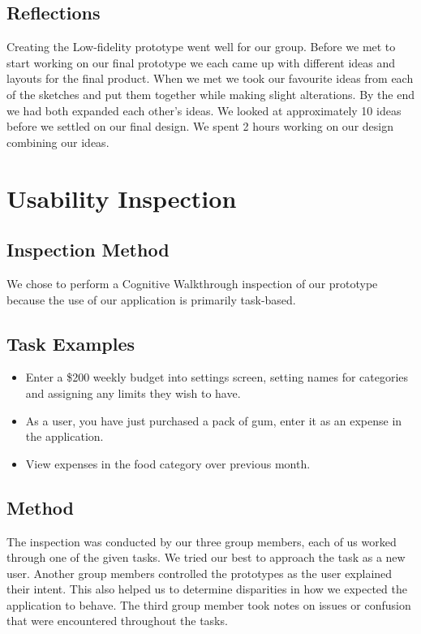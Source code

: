 \documentclass{chi2011}
\begin{document}
    \subsection{Reflections}

    Creating the Low-fidelity prototype went well for our group. Before we met
    to start working on our final prototype we each came up with different
    ideas and layouts for the final product. When we met we took our favourite
    ideas from each of the sketches and put them together while making slight
    alterations. By the end we had both expanded each other's ideas. We looked at
    approximately 10 ideas before we settled on our final design.
    We spent 2 hours working on our design combining our ideas.

\section{Usability Inspection}
    \subsection{Inspection Method}
    We chose to perform a Cognitive Walkthrough inspection of our prototype because the use of our application
    is primarily task-based. 

    \subsection{Task Examples}
    \begin{itemize}
        \item Enter a \$200 weekly budget into settings screen, setting names for categories and assigning any limits
            they wish to have.
        \item As a user, you have just purchased a pack of gum, enter it as an expense in the application.
        \item View expenses in the food category over previous month.
    \end{itemize}

    \subsection{Method}
    The inspection was conducted by our three group members, each of us worked through one of the given tasks. We
    tried our best to approach the task as a new user. Another group members controlled the prototypes as the user
    explained their intent. This also helped us to determine disparities in how we expected the application to behave.
    The third group member took notes on issues or confusion that were encountered throughout the tasks.
\end{document}
